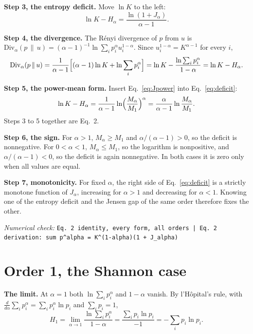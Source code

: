 \documentclass[11pt]{article}
\newcommand{\Div}{\mathrm{Div}}
\newcommand{\numcheck}[1]{\par{\small\raggedright\noindent\textit{Numerical check:} \texttt{#1}\par}}
\begin{document}
\textbf{Step 3, the entropy deficit.} Move $\ln K$ to the left:
\begin{equation}
\ln K - H_\alpha = \frac{\ln(1+J_\alpha)}{\alpha-1} .
\label{eq:deficit}
\end{equation}

\textbf{Step 4, the divergence.} The R\'enyi divergence of $p$ from $u$ is
$\Div_\alpha(p\,\|\,u) = (\alpha-1)^{-1}\ln\sum_i p_i^{\alpha}u_i^{1-\alpha}$. Since $u_i^{1-\alpha} = K^{\alpha-1}$ for
every $i$,
\begin{equation}
\Div_\alpha(p\,\|\,u) = \frac{1}{\alpha-1}\Bigl[(\alpha-1)\ln K + \ln\sum_i p_i^{\alpha}\Bigr]
= \ln K - \frac{\ln\sum_i p_i^{\alpha}}{1-\alpha} = \ln K - H_\alpha .
\end{equation}

\textbf{Step 5, the power-mean form.} Insert Eq.~\eqref{eq:Jpower} into Eq.~\eqref{eq:deficit}:
\begin{equation}
\ln K - H_\alpha = \frac{1}{\alpha-1}\ln\Bigl(\frac{M_\alpha}{M_1}\Bigr)^{\alpha} = \frac{\alpha}{\alpha-1}\ln\frac{M_\alpha}{M_1} .
\end{equation}
Steps 3 to 5 together are Eq.~2.

\textbf{Step 6, the sign.} For $\alpha>1$, $M_\alpha\ge M_1$ and $\alpha/(\alpha-1)>0$, so the deficit is
nonnegative. For $0<\alpha<1$, $M_\alpha\le M_1$, so the logarithm is nonpositive, and $\alpha/(\alpha-1)<0$, so
the deficit is again nonnegative. In both cases it is zero only when all values are equal.

\textbf{Step 7, monotonicity.} For fixed $\alpha$, the right side of Eq.~\eqref{eq:deficit} is a strictly monotone
function of $J_\alpha$, increasing for $\alpha>1$ and decreasing for $\alpha<1$. Knowing one of the entropy deficit
and the Jensen gap of the same order therefore fixes the other.
\numcheck{Eq. 2 identity, every form, all orders | Eq. 2 derivation: sum p\^{}alpha = K\^{}(1-alpha)(1 + J\_alpha)}

\section{Order 1, the Shannon case}
\label{sec:order1}

\textbf{The limit.} At $\alpha=1$ both $\ln\sum_ip_i^{\alpha}$ and $1-\alpha$ vanish. By l'H\^opital's rule, with
$\frac{d}{d\alpha}\sum_i p_i^{\alpha} = \sum_i p_i^{\alpha}\ln p_i$ and $\sum_i p_i=1$,
\begin{equation}
H_1 = \lim_{\alpha\to1}\frac{\ln\sum_ip_i^{\alpha}}{1-\alpha} = \frac{\sum_i p_i\ln p_i}{-1} = -\sum_i p_i\ln p_i .
\end{equation}
\end{document}
